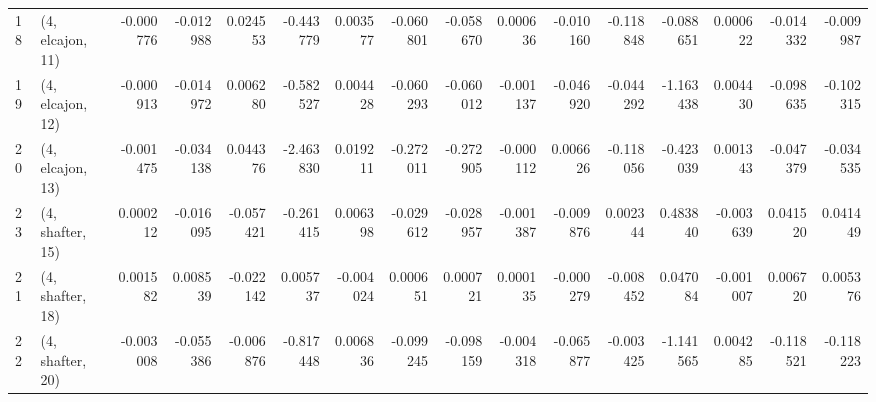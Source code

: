 \begin{tabular}{llrrrrrrrrrrrrrr}
18 &  (4, elcajon, 11) &  -0.000776 & -0.012988 &  0.024553 &  -0.443779 &  0.003577 &  -0.060801 & -0.058670 &  0.000636 & -0.010160 & -0.118848 &  -0.088651 &  0.000622 & -0.014332 & -0.009987 \\
19 &  (4, elcajon, 12) &  -0.000913 & -0.014972 &  0.006280 &  -0.582527 &  0.004428 &  -0.060293 & -0.060012 & -0.001137 & -0.046920 & -0.044292 &  -1.163438 &  0.004430 & -0.098635 & -0.102315 \\
20 &  (4, elcajon, 13) &  -0.001475 & -0.034138 &  0.044376 &  -2.463830 &  0.019211 &  -0.272011 & -0.272905 & -0.000112 &  0.006626 & -0.118056 &  -0.423039 &  0.001343 & -0.047379 & -0.034535 \\
23 &  (4, shafter, 15) &   0.000212 & -0.016095 & -0.057421 &  -0.261415 &  0.006398 &  -0.029612 & -0.028957 & -0.001387 & -0.009876 &  0.002344 &   0.483840 & -0.003639 &  0.041520 &  0.041449 \\
21 &  (4, shafter, 18) &   0.001582 &  0.008539 & -0.022142 &   0.005737 & -0.004024 &   0.000651 &  0.000721 &  0.000135 & -0.000279 & -0.008452 &   0.047084 & -0.001007 &  0.006720 &  0.005376 \\
22 &  (4, shafter, 20) &  -0.003008 & -0.055386 & -0.006876 &  -0.817448 &  0.006836 &  -0.099245 & -0.098159 & -0.004318 & -0.065877 & -0.003425 &  -1.141565 &  0.004285 & -0.118521 & -0.118223 \\
\bottomrule
\end{tabular}
